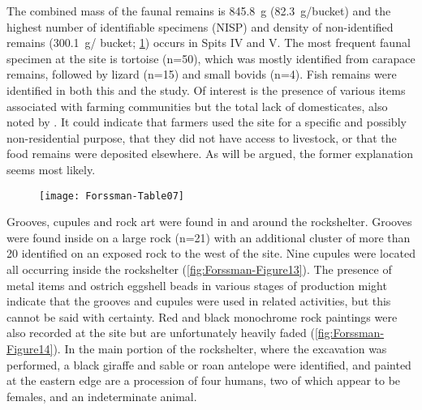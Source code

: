 The combined  mass of the faunal remains is \SI{845.8}{\gram} (\SI{82.3}{\gram}/bucket) and the highest number of identifiable specimens (NISP) 
and density of non-identified remains (\SI{300.1}{\gram}/ bucket; \cref{fig:Forssman-Table07}) occurs in Spits IV and V. 
The most frequent faunal specimen at the site is tortoise (n=50), which was mostly identified from carapace remains, followed by lizard (n=15) and small bovids (n=4). Fish remains were identified in both this and the \textcite{Walker_1994} study. 
Of interest is the presence of various items associated with farming communities but the total lack of domesticates, 
also noted by \textcite{Walker_1994}. 
It could indicate that farmers used the site for a specific and possibly non-residential purpose, that they did not have access to livestock, 
or that the food remains were deposited elsewhere. 
As will be argued, the former explanation seems most likely.

    	\begin{figure} %
    		\texttt{[image: Forssman-Table07]}
    		\centering
    		\label{fig:Forssman-Table07}
    	\end{figure}


Grooves, cupules and  rock art were found in and around the rockshelter. Grooves were found inside on a large rock (n=21) with an additional cluster of more than 20 identified on an exposed rock to the west of the site. 
Nine cupules were located all occurring inside the rockshelter (\cref{fig:Forssman-Figure13}). 
The presence of metal items and ostrich eggshell beads in various stages of production might indicate that 
the grooves and cupules were used in related activities, but this cannot be said with certainty. 
Red and black monochrome rock paintings were also recorded at the site but are unfortunately heavily faded (\cref{fig:Forssman-Figure14}).
In the main portion of the rockshelter, where the excavation was performed, a black giraffe and sable or roan antelope were identified, and painted at the eastern edge are a procession of four humans, two of which appear to be females, and an indeterminate animal. 

